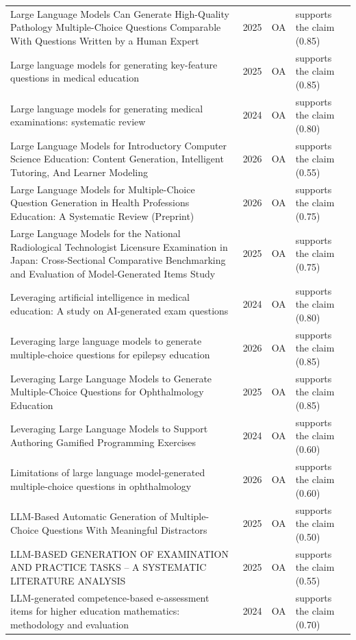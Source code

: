 \begin{longtable}{@{}%
  >{\raggedright\arraybackslash}p{}c%
  >{\raggedright\arraybackslash}p{}%
  >{\raggedright\arraybackslash}p{}@{}}
Large Language Models Can Generate High-Quality Pathology Multiple-Choice Questions Comparable With Questions Written by a Human Expert & 2025 & OA & supports the claim (0.85) \\
Large language models for generating key-feature questions in medical education & 2025 & OA & supports the claim (0.85) \\
Large language models for generating medical examinations: systematic review & 2024 & OA & supports the claim (0.80) \\
Large Language Models for Introductory Computer Science Education: Content Generation, Intelligent Tutoring, And Learner Modeling & 2026 & OA & supports the claim (0.55) \\
Large Language Models for Multiple-Choice Question Generation in Health Professions Education: A Systematic Review (Preprint) & 2026 & OA & supports the claim (0.75) \\
Large Language Models for the National Radiological Technologist Licensure Examination in Japan: Cross-Sectional Comparative Benchmarking and Evaluation of Model-Generated Items Study & 2025 & OA & supports the claim (0.75) \\
Leveraging artificial intelligence in medical education: A study on AI-generated exam questions & 2024 & OA & supports the claim (0.80) \\
Leveraging large language models to generate multiple-choice questions for epilepsy education & 2026 & OA & supports the claim (0.85) \\
Leveraging Large Language Models to Generate Multiple-Choice Questions for Ophthalmology Education & 2025 & OA & supports the claim (0.85) \\
Leveraging Large Language Models to Support Authoring Gamified Programming Exercises & 2024 & OA & supports the claim (0.60) \\
Limitations of large language model-generated multiple-choice questions in ophthalmology & 2026 & OA & supports the claim (0.60) \\
LLM-Based Automatic Generation of Multiple-Choice Questions With Meaningful Distractors & 2025 & OA & supports the claim (0.50) \\
LLM-BASED GENERATION OF EXAMINATION AND PRACTICE TASKS -- A SYSTEMATIC LITERATURE ANALYSIS & 2025 & OA & supports the claim (0.55) \\
LLM-generated competence-based e-assessment items for higher education mathematics: methodology and evaluation & 2024 & OA & supports the claim (0.70) \\

\end{longtable}
